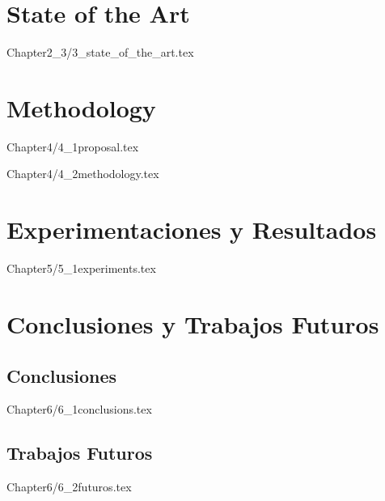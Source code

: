 \documentclass{report}
\begin{document}
\chapter{State of the Art}
{Chapter2_3/3_state_of_the_art.tex}


\chapter{Methodology}
{Chapter4/4_1proposal.tex}

{Chapter4/4_2methodology.tex}





\chapter{Experimentaciones y Resultados}
 {Chapter5/5_1experiments.tex}



\chapter{Conclusiones y Trabajos Futuros}

 \section{Conclusiones}
 {Chapter6/6_1conclusions.tex}

 \section{Trabajos Futuros}
 {Chapter6/6_2futuros.tex}
\end{document}
